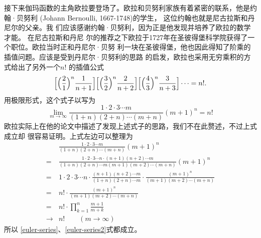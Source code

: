 接下来伽玛函数的主角欧拉要登场了。欧拉和贝努利家族有着紧密的联系，他是约翰·贝努利
(Johann Bernoulli, 1667-1748)的学生， 这位约翰也就是尼古拉斯和丹尼尔的父亲。我
们应该感谢约翰·贝努利，因为正是他发现并培养了欧拉的数学才能。 在尼古拉斯和丹尼
尔的推荐之下欧拉于1727年在圣彼得堡科学院获得了一个职位。欧拉当时正和丹尼尔·贝努
利一块在圣彼得堡，他也因此得知了阶乘的插值问题。应该是受到丹尼尔·贝努利的思路
的启发，欧拉也采用无穷乘积的方式给出了另外一个$n!$ 的插值公式
\begin{equation}
\label{euler-series}
\Bigl[\Bigl(\frac{2}{1}\Bigr)^n\frac{1}{n+1}\Bigr]
\Bigl[\Bigl(\frac{3}{2}\Bigr)^n\frac{2}{n+2}\Bigr]
\Bigl[\Bigl(\frac{4}{3}\Bigr)^n\frac{3}{n+3}\Bigr] \cdots = n! .
\end{equation}
用极限形式，这个式子以写为
\begin{equation}
\label{euler-series2}
\lim_{m \rightarrow \infty} \frac{1\cdot 2\cdot 3 \cdots m}{(1+n)(2+n)\cdots (m+n)}(m+1)^{n} = n!
\end{equation}
欧拉实际上在他的论文中描述了发现上述式子的思路，我们不在此赘述，不过上式成立却
很容易证明。上式左边可以整理为
\begin{align*}
& \frac{1\cdot 2\cdot 3 \cdots m}{(1+n)(2+n)\cdots (m+n)}(m+1)^{n}  \\
= & \frac{1\cdot 2\cdot 3 \cdots n \cdot (n+1)(n+2) \cdots m}{(1+n)(2+n)\cdots m (m+1)(m+2)\cdots (m+n)}
     (m+1)^{n} \\
= & 1\cdot 2\cdot 3 \cdots n \cdot \frac{(n+1)(n+2) \cdots m}{(1+n)(2+n)\cdots m }
     \cdot \frac{(m+1)^{n}}{(m+1)(m+2)\cdots (m+n)} \\
= & n! \cdot \frac{(m+1)^{n}}{(m+1)(m+2)\cdots (m+n)} \\
= & n! \cdot \prod_{k=1}^{n} \frac{m+1}{m+k}  \\
\rightarrow & n! \qquad (m\rightarrow \infty)
\end{align*}
所以 \eqref{euler-series}、\eqref{euler-series2}式都成立。

